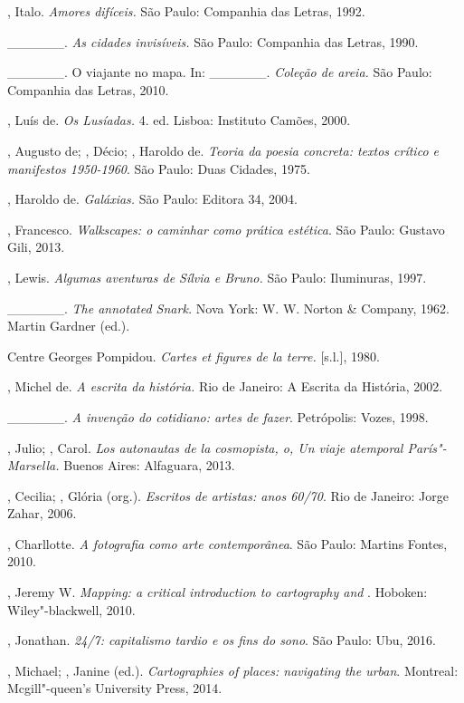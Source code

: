 \begin{Parskip}
, Italo. \emph{Amores difíceis.} São Paulo: Companhia das
Letras, 1992.

\_\_\_\_\_\_. \emph{As cidades invisíveis.} São Paulo: Companhia
das Letras, 1990.

\_\_\_\_\_\_. O viajante no mapa. In: \_\_\_\_\_\_.
\emph{Coleção de areia.} São Paulo: Companhia das Letras, 2010.

, Luís de. \emph{Os Lusíadas.} 4. ed. Lisboa: Instituto Camões,
2000.

, Augusto de; , Décio; , Haroldo de. \emph{Teoria da poesia concreta: textos crítico e manifestos 1950-1960}. São Paulo:
Duas Cidades, 1975.

, Haroldo de. \emph{Galáxias.} São Paulo: Editora 34, 2004.

, Francesco. \emph{Walkscapes: o caminhar como prática
estética}. São Paulo: Gustavo Gili, 2013.

, Lewis. \emph{Algumas aventuras de Sílvia e Bruno.} São Paulo:
Iluminuras, 1997.

\_\_\_\_\_\_. \emph{The annotated Snark.} Nova York: W. W. Norton
\& Company, 1962. Martin Gardner (ed.).

Centre Georges Pompidou. \emph{Cartes et figures de la terre.}
{[}s.l.{]}, 1980.

, Michel de. \emph{A escrita da história.} Rio de Janeiro: A
Escrita da História, 2002. %

\_\_\_\_\_\_. \emph{A invenção do cotidiano: artes de fazer}.
Petrópolis: Vozes, 1998.

, Julio; , Carol. \emph{Los autonautas de la cosmopista,
o, Un viaje atemporal París"-Marsella.} Buenos Aires: Alfaguara, 2013.

, Cecilia; , Glória (org.). \emph{Escritos de artistas:
anos 60/70}. Rio de Janeiro: Jorge Zahar, 2006.

, Charllotte. \emph{A fotografia como arte contemporânea}. São
Paulo: Martins Fontes, 2010.

, Jeremy W. \emph{Mapping: a critical introduction to
cartography and }. Hoboken: Wiley"-blackwell, 2010.

, Jonathan. \emph{24/7: capitalismo tardio e os fins do sono}.
São Paulo: Ubu, 2016.

, Michael; , Janine (ed.). \emph{Cartographies of
places: navigating the urban}. Montreal: Mcgill"-queen's University
Press, 2014.


\end{Parskip}
